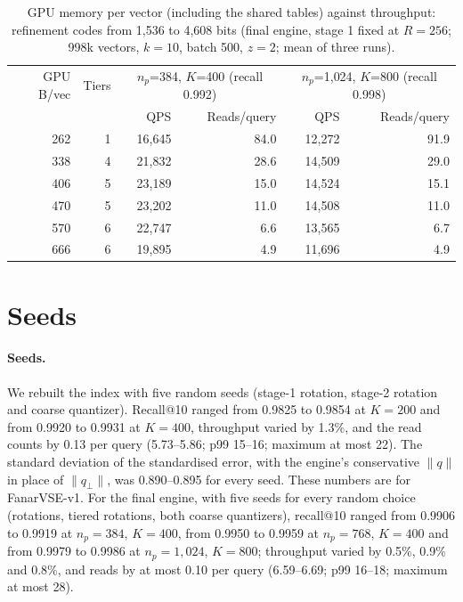 \documentclass[10pt]{article}
\begin{document}
\begin{table}[!htbp]
\caption{GPU memory per vector (including the shared tables) against throughput: refinement codes from 1{,}536 to 4{,}608 bits (final engine, stage 1 fixed at $R=256$; 998k vectors, $k=10$, batch 500, $z=2$; mean of three runs).}
\label{tab:mem}
\small
\begin{tabular}{rrrrrr}
\toprule
GPU B/vec & Tiers & \multicolumn{2}{c}{$n_p$=384, $K$=400 (recall 0.992)} & \multicolumn{2}{c}{$n_p$=1{,}024, $K$=800 (recall 0.998)} \\
 & & QPS & Reads/query & QPS & Reads/query \\
\midrule
262 & 1 & 16{,}645 & 84.0 & 12{,}272 & 91.9 \\
338 & 4 & 21{,}832 & 28.6 & 14{,}509 & 29.0 \\
406 & 5 & 23{,}189 & 15.0 & 14{,}524 & 15.1 \\
470 & 5 & 23{,}202 & 11.0 & 14{,}508 & 11.0 \\
570 & 6 & 22{,}747 & 6.6 & 13{,}565 & 6.7 \\
666 & 6 & 19{,}895 & 4.9 & 11{,}696 & 4.9 \\
\bottomrule
\end{tabular}
\end{table}

\section{Seeds}\label{sn:seeds}
\paragraph{Seeds.} We rebuilt the index with five random seeds (stage-1 rotation, stage-2 rotation and coarse quantizer). Recall@10 ranged from 0.9825 to 0.9854 at $K=200$ and from 0.9920 to 0.9931 at $K=400$, throughput varied by 1.3\%, and the read counts by 0.13 per query (5.73--5.86; p99 15--16; maximum at most 22). The standard deviation of the standardised error, with the engine's conservative $\|q\|$ in place of $\|q_\perp\|$, was 0.890--0.895 for every seed. These numbers are for FanarVSE-v1. For the final engine, with five seeds for every random choice (rotations, tiered rotations, both coarse quantizers), recall@10 ranged from 0.9906 to 0.9919 at $n_p=384$, $K=400$, from 0.9950 to 0.9959 at $n_p=768$, $K=400$ and from 0.9979 to 0.9986 at $n_p=1{,}024$, $K=800$; throughput varied by 0.5\%, 0.9\% and 0.8\%, and reads by at most 0.10 per query (6.59--6.69; p99 16--18; maximum at most 28).
\end{document}
